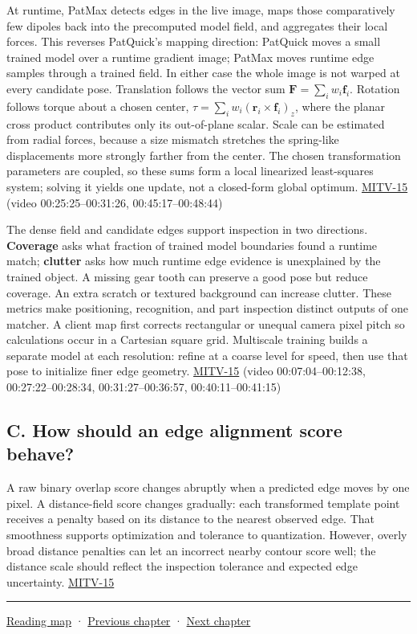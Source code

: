 At runtime, PatMax detects edges in the live image, maps those comparatively few dipoles back into the precomputed model field, and aggregates their local forces. This reverses PatQuick's mapping direction: PatQuick moves a small trained model over a runtime gradient image; PatMax moves runtime edge samples through a trained field. In either case the whole image is not warped at every candidate pose. Translation follows the vector sum \(\mathbf{F}=\sum_i w_i\mathbf{f}_i\). Rotation follows torque about a chosen center, \(\tau=\sum_i w_i(\mathbf{r}_i\times\mathbf{f}_i)_z\), where the planar cross product contributes only its out-of-plane scalar. Scale can be estimated from radial forces, because a size mismatch stretches the spring-like displacements more strongly farther from the center. The chosen transformation parameters are coupled, so these sums form a local linearized least-squares system; solving it yields one update, not a closed-form global optimum. \hyperref[04-visual-computing-ii-ch036-mitv-15---alignment-patmax-distance-field-filtering-and-sub-sampling-us-7065262]{MITV-15} (video 00:25:25--00:31:26, 00:45:17--00:48:44)

The dense field and candidate edges support inspection in two directions. \textbf{Coverage} asks what fraction of trained model boundaries found a runtime match; \textbf{clutter} asks how much runtime edge evidence is unexplained by the trained object. A missing gear tooth can preserve a good pose but reduce coverage. An extra scratch or textured background can increase clutter. These metrics make positioning, recognition, and part inspection distinct outputs of one matcher. A client map first corrects rectangular or unequal camera pixel pitch so calculations occur in a Cartesian square grid. Multiscale training builds a separate model at each resolution: refine at a coarse level for speed, then use that pose to initialize finer edge geometry. \hyperref[04-visual-computing-ii-ch036-mitv-15---alignment-patmax-distance-field-filtering-and-sub-sampling-us-7065262]{MITV-15} (video 00:07:04--00:12:38, 00:27:22--00:28:34, 00:31:27--00:36:57, 00:40:11--00:41:15)

\subsection{C. How should an edge alignment score behave?}\label{04-visual-computing-ii-ch030-c.-how-should-an-edge-alignment-score-behave}

A raw binary overlap score changes abruptly when a predicted edge moves by one pixel. A distance-field score changes gradually: each transformed template point receives a penalty based on its distance to the nearest observed edge. That smoothness supports optimization and tolerance to quantization. However, overly broad distance penalties can let an incorrect nearby contour score well; the distance scale should reflect the inspection tolerance and expected edge uncertainty. \hyperref[04-visual-computing-ii-ch036-mitv-15---alignment-patmax-distance-field-filtering-and-sub-sampling-us-7065262]{MITV-15}

\begin{center}\rule{0.5\linewidth}{0.5pt}\end{center}

\hyperref[volume-reading-map]{Reading map} · \hyperref[04-visual-computing-ii-ch029]{Previous chapter} · \hyperref[04-visual-computing-ii-ch031]{Next chapter}
